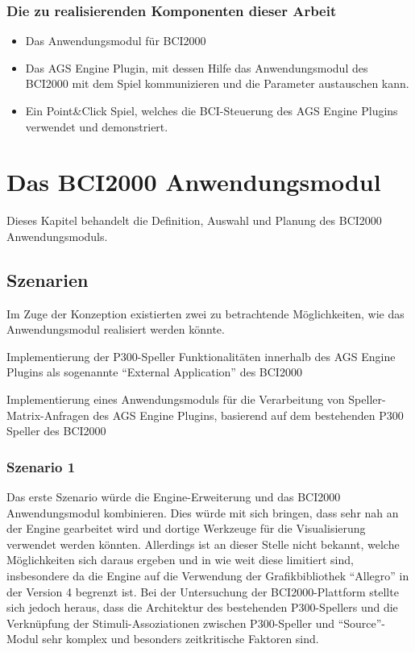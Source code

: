 \subsubsection{Die zu realisierenden Komponenten dieser Arbeit}
\begin{itemize}
\item Das Anwendungsmodul für BCI2000
\item Das AGS Engine Plugin, mit dessen Hilfe das Anwendungsmodul des \acs{BCI2000} mit dem Spiel kommunizieren und die Parameter austauschen kann.
\item Ein Point\&Click Spiel, welches die \acs{BCI}-Steuerung des AGS Engine Plugins verwendet und demonstriert.
\end{itemize}





\pagebreak
\section{Das BCI2000 Anwendungsmodul}

Dieses Kapitel behandelt die Definition, Auswahl und Planung des BCI2000 Anwendungsmoduls.

\subsection{Szenarien}
\vspace{0.3cm}
Im Zuge der Konzeption existierten zwei zu betrachtende Möglichkeiten, wie das Anwendungsmodul realisiert werden könnte.

\begin{itemize}
\setlength{\itemsep}{0pt}
\footnotesize
{
\item[1.] Implementierung der P300-Speller Funktionalitäten innerhalb des AGS Engine Plugins als sogenannte "`External Application"' des \acs{BCI2000}
\item[2.] Implementierung eines Anwendungsmoduls für die Verarbeitung von Speller-Matrix-Anfragen des \acs{AGS} Engine Plugins, basierend auf dem bestehenden P300 Speller des \acs{BCI2000}\\
}
\end{itemize}

\subsubsection{Szenario 1}
Das erste Szenario würde die Engine-Erweiterung und das BCI2000 Anwendungsmodul kombinieren. 
Dies würde mit sich bringen, dass sehr nah an der Engine gearbeitet wird und dortige Werkzeuge für die Visualisierung verwendet werden könnten.
Allerdings ist an dieser Stelle nicht bekannt, welche Möglichkeiten sich daraus ergeben und in wie weit diese limitiert sind, 
insbesondere da die Engine auf die Verwendung der Grafikbibliothek "`Allegro"' in der Version 4 begrenzt ist.
Bei der Untersuchung der \acs{BCI2000}-Plattform stellte sich jedoch heraus, 
dass die Architektur des bestehenden P300-Spellers und die Verknüpfung der Stimuli-Assoziationen zwischen P300-Speller 
und "`Source"'-Modul sehr komplex und besonders zeitkritische Faktoren sind.

